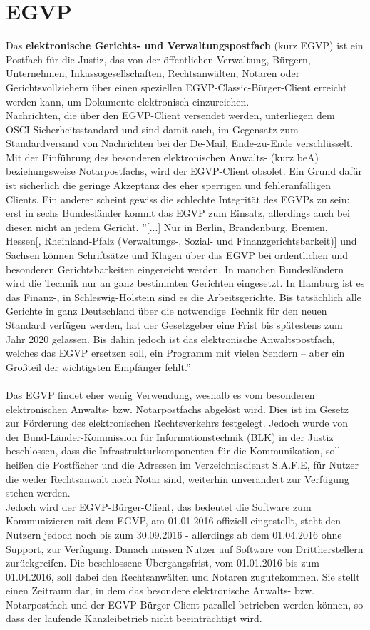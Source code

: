 \section{EGVP}
Das \textbf{elektronische Gerichts- und Verwaltungspostfach} (kurz EGVP) ist ein Postfach für die Justiz, das von der öffentlichen Verwaltung, Bürgern, Unternehmen, Inkassogesellschaften, Rechtsanwälten, Notaren oder Gerichtsvollziehern über einen speziellen EGVP-Classic-Bürger-Client erreicht werden kann, um Dokumente elektronisch einzureichen. \\
Nachrichten, die über den EGVP-Client versendet werden, unterliegen dem OSCI-Sicherheitsstandard und sind damit auch, im Gegensatz zum Standardversand von Nachrichten bei der De-Mail, Ende-zu-Ende verschlüsselt. Mit der Einführung des besonderen elektronischen Anwalts- (kurz beA) beziehungsweise Notarpostfachs, wird der EGVP-Client obsolet. Ein Grund dafür ist sicherlich die geringe Akzeptanz des eher sperrigen und fehleranfälligen Clients. Ein anderer scheint gewiss die schlechte Integrität des EGVPs zu sein: erst in sechs Bundesländer kommt das EGVP zum Einsatz, allerdings auch bei diesen nicht an jedem Gericht. ''[...] Nur in Berlin, Brandenburg, Bremen, Hessen[, Rheinland-Pfalz (Verwaltungs-, Sozial- und Finanzgerichtsbarkeit)] und Sachsen können Schriftsätze und Klagen über das EGVP bei ordentlichen und besonderen Gerichtsbarkeiten eingereicht werden.
In manchen Bundesländern wird die Technik nur an ganz bestimmten Gerichten eingesetzt. In Hamburg ist es das Finanz-, in Schleswig-Holstein sind es die Arbeitsgerichte. Bis tatsächlich alle Gerichte in ganz Deutschland über die notwendige Technik für den neuen Standard verfügen werden, hat der Gesetzgeber eine Frist bis spätestens zum Jahr 2020 gelassen. Bis dahin jedoch ist das elektronische Anwaltspostfach, welches das EGVP ersetzen soll, ein Programm mit vielen Sendern – aber ein Großteil der wichtigsten Empfänger fehlt.'' \textcite{bea:egvp:landkarte} \\
\\
Das EGVP findet eher wenig Verwendung, weshalb es vom besonderen elektronischen Anwalts- bzw. Notarpostfachs abgelöst wird. Dies ist im Gesetz zur Förderung des elektronischen Rechtsverkehrs festgelegt. Jedoch wurde von der Bund-Länder-Kommission für Informationstechnik (BLK) in der Justiz beschlossen, dass die Infrastrukturkomponenten für die Kommunikation, soll heißen die Postfächer und die Adressen im Verzeichnisdienst S.A.F.E, für Nutzer die weder Rechtsanwalt noch Notar sind, weiterhin unverändert zur Verfügung stehen werden. \textcite{bea:egvp} \\
Jedoch wird der EGVP-Bürger-Client, das bedeutet die Software zum Kommunizieren mit dem EGVP, am 01.01.2016 offiziell eingestellt, steht den Nutzern jedoch noch bis zum 30.09.2016 - allerdings ab dem 01.04.2016 ohne Support, zur Verfügung. Danach müssen Nutzer auf Software von Drittherstellern zurückgreifen. Die beschlossene Übergangsfrist, vom 01.01.2016 bis zum 01.04.2016, soll dabei den Rechtsanwälten und Notaren zugutekommen. Sie stellt einen Zeitraum dar, in dem das besondere elektronische Anwalts- bzw. Notarpostfach und der EGVP-Bürger-Client parallel betrieben werden können, so dass der laufende Kanzleibetrieb nicht beeinträchtigt wird.